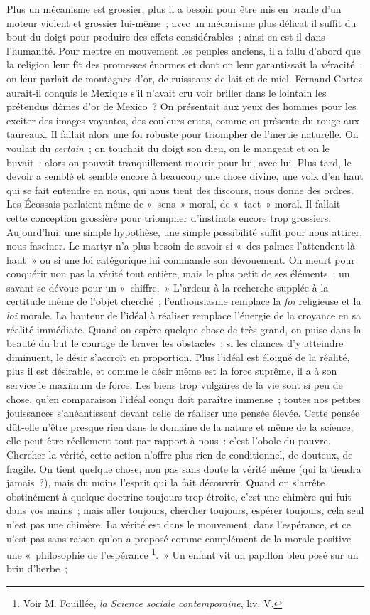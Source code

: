 \documentclass[french,twoside]{book} %
\begin{document}
Plus un mécanisme est grossier, plus il a besoin pour être mis en branle d’un moteur violent et grossier lui-même ; avec un mécanisme plus délicat il suffit du bout du doigt pour produire des effets considérables ; ainsi en est-il dans l’humanité. Pour mettre en mouvement les peuples anciens, il a fallu d’abord que la religion leur fît des promesses énormes et dont on leur garantissait la véracité : on leur parlait de montagnes d’or, de ruisseaux de lait et de miel. Fernand Cortez aurait-il conquis le Mexique s’il n’avait cru voir briller dans le lointain les prétendus dômes d’or de Mexico ? On présentait aux yeux des hommes pour les exciter des images voyantes, des couleurs crues, comme on présente du rouge aux taureaux. Il fallait alors une foi robuste pour triompher de l’inertie naturelle. On voulait du \emph{certain} ; on touchait du doigt son dieu, on le mangeait et on le buvait : alors on pouvait tranquillement mourir pour lui, avec lui. Plus tard, le devoir a semblé et semble encore à beaucoup une chose divine, une voix d’en haut qui se fait entendre en nous, qui nous tient des discours, nous donne des ordres. Les Écossais parlaient même de « sens » moral, de « tact » moral. Il fallait cette conception grossière pour triompher d’instincts encore trop grossiers. Aujourd’hui, une simple hypothèse, une simple possibilité suffit pour nous attirer, nous fasciner. Le martyr n’a plus besoin de savoir si « des palmes l’attendent là-haut » ou si une loi catégorique lui commande son dévouement. On meurt pour conquérir non pas la vérité tout entière, mais le plus petit de ses éléments ; un savant se dévoue pour un « chiffre. » L’ardeur à la recherche supplée à la certitude même de l’objet cherché ; l’enthousiasme remplace la \emph{foi} religieuse et la \emph{loi} morale. La hauteur de l’idéal à réaliser remplace l’énergie de la croyance en sa réalité immédiate. Quand on espère quelque chose de très grand, on puise dans la beauté du but le courage de braver les obstacles ; si les chances d’y atteindre diminuent, le désir s’accroît en proportion. Plus l’idéal est éloigné de la réalité, plus il est désirable, et comme le désir même est la force suprême, il a à son service le maximum de force. Les biens trop vulgaires de la vie sont si peu de chose, qu’en comparaison l’idéal conçu doit paraître immense ; toutes nos petites jouissances s’anéantissent devant celle de réaliser une pensée élevée. Cette pensée dût-elle n’être presque rien dans le domaine de la nature et même de la science, elle peut être réellement tout par rapport à nous : c’est l’obole du pauvre. Chercher la vérité, cette action n’offre plus rien de conditionnel, de douteux, de fragile. On tient quelque chose, non pas sans doute la vérité même (qui la tiendra jamais ?), mais du moins l’esprit qui la fait découvrir. Quand on s’arrête obstinément à quelque doctrine toujours trop étroite, c’est une chimère qui fuit dans vos mains ; mais aller toujours, chercher toujours, espérer toujours, cela seul n’est pas une chimère. La vérité est dans le mouvement, dans l’espérance, et ce n’est pas sans raison qu’on a proposé comme complément de la morale positive une « philosophie de l’espérance \footnote{Voir M. Fouillée, \emph{la Science sociale contemporaine}, liv. V.}. » Un enfant vit un papillon bleu posé sur un brin d’herbe ; 
\end{document}
